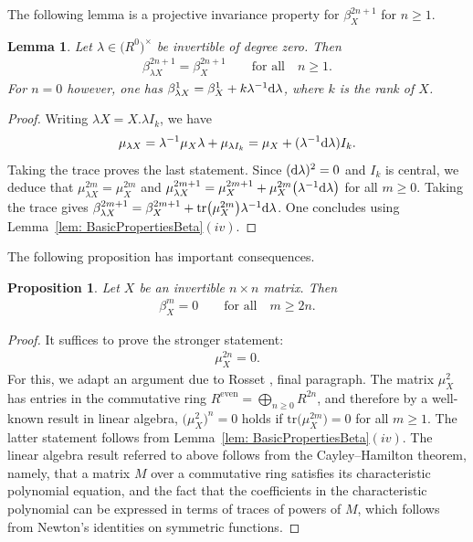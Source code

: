 \documentclass[pdftex]{sigma}%
\newtheorem{lem}[thm]{Lemma}
\newtheorem{prop}[thm]{Proposition}
\numberwithin{equation}{section}
\newcommand{\tr}{\mathrm{tr}}
\newcommand{\mc}{\mu}
\newcommand{\0}{\color{blue}{\mathsf{0}}}
\begin{document}
The following lemma is a projective invariance property for $\beta_X^{2n+1}$ for $n\geq 1$.
\begin{lem} \label{lem: projinv}
Let $\lambda \in \big(R^0\big)^{\times}$ be invertible of degree zero. Then
\begin{gather*}
\beta^{2n+1}_{\lambda X} = \beta^{2n+1}_{X} \qquad \text{for all} \quad n\geq 1.
\end{gather*}
For $n=0$ however, one has $\beta^1_{\lambda X} = \beta^1_{X} + k \lambda^{-1} {\rm d}\lambda$, where $k$ is the rank of $X$.
\end{lem}
\begin{proof} Writing $\lambda X = X. \lambda I_k$, we have
\begin{gather*}
\mc_{\lambda X}=\lambda^{-1}\mc_X\lambda + \mc_{\lambda I_k}=\mc_X + (\lambda^{-1} {\rm d}\lambda)I_k.
\end{gather*}
Taking the trace proves the last statement.
Since $({\rm d} \lambda)^2=0$ and $I_k$ is central, we deduce that
$ \mc^{2m}_{\lambda X} = \mc_X^{2m}$ and $ \mc^{2m+1}_{\lambda X} = \mc_X^{2m+1} + \mc_X^{2m} \big(\lambda^{-1} {\rm d}\lambda \big) $
for all $m\geq 0$. Taking the trace gives $\beta^{2m+1}_{\lambda X} = \beta_X^{2m+1} +\tr \big(\mc_X^{2m}\big) \lambda^{-1} {\rm d}\lambda $. One concludes using Lemma~\ref{lem: BasicPropertiesBeta}$(iv)$.
\end{proof}

The following proposition has important consequences.
 \begin{prop} \label{prop: betavanishes}
 Let $X$ be an invertible $n\times n$ matrix. Then
\begin{gather*}
\beta_X^{m} =0 \qquad \text{for all}\quad m\geq 2n.
\end{gather*}
\end{prop}

\begin{proof}
It suffices to prove the stronger statement:
\begin{gather} \label{mu2nvanishes}
\mc^{2n}_X= 0 .
\end{gather}
For this, we adapt an argument due to Rosset \cite{Rosset76}, final paragraph.
The matrix $\mu_X^2$ has entries in the commutative ring $R^{\mathrm{even}} = \bigoplus_{n\geq 0} R^{2n}$, and therefore by a well-known result in linear algebra, $\big(\mu_X^2\big)^{n}=0$ holds if $\tr\big(\mu_X^{2m}\big)=0$ for all $m\geq 1$. The latter statement follows from Lemma~\ref{lem: BasicPropertiesBeta}$(iv)$. The linear algebra result referred to above follows from the Cayley--Hamilton theorem, namely, that a matrix $M$ over a commutative ring satisfies its characteristic polynomial equation, and the fact that the coefficients in the characteristic polynomial can be expressed in terms of traces of powers of $M$, which follows from Newton's identities on symmetric functions.
\end{proof}
\end{document}

